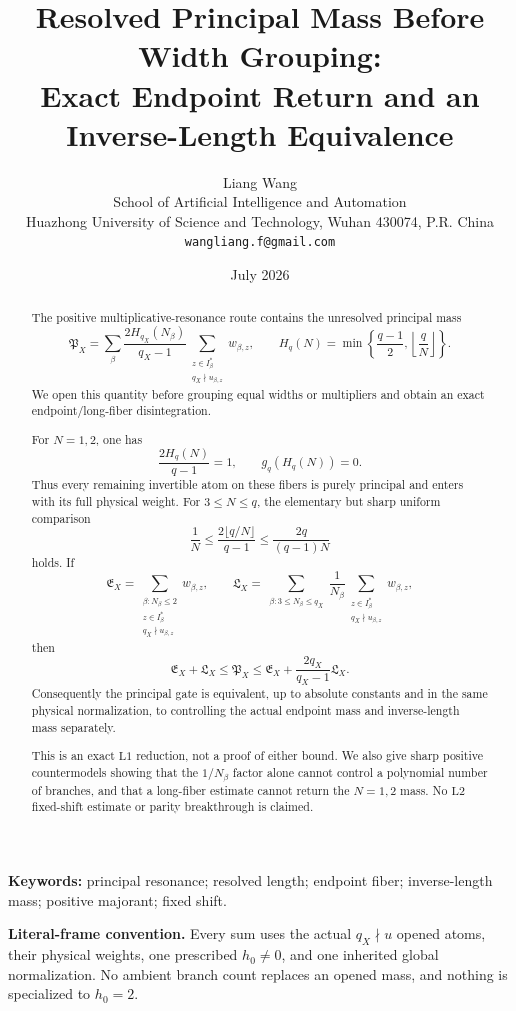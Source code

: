 \documentclass[11pt]{article}
\title{\textbf{Resolved Principal Mass Before Width Grouping:}\\
Exact Endpoint Return and an Inverse-Length Equivalence}
\author{Liang Wang\\
School of Artificial Intelligence and Automation\\
Huazhong University of Science and Technology, Wuhan 430074, P.R. China\\
\texttt{wangliang.f@gmail.com}}
\date{July 2026}
\theoremstyle{definition}
\theoremstyle{remark}
\newcommand{\Lone}{\mathrm{L1}}
\newcommand{\Ltwo}{\mathrm{L2}}
\begin{document}
\maketitle

\begin{abstract}
The positive multiplicative-resonance route contains the unresolved
principal mass
\[
 \mathfrak P_X
 =
 \sum_\beta
 \frac{2H_{q_X}(N_\beta)}{q_X-1}
 \sum_{\substack{z\in I_\beta^\ast\\q_X\nmid u_{\beta,z}}}
 w_{\beta,z},
 \qquad
 H_q(N)=
 \min\!\left\{\frac{q-1}{2},\left\lfloor\frac qN\right\rfloor\right\}.
\]
We open this quantity before grouping equal widths or multipliers
and obtain an exact endpoint/long-fiber disintegration.

For \(N=1,2\), one has
\[
 \frac{2H_q(N)}{q-1}=1,\qquad
 g_q(H_q(N))=0.
\]
Thus every remaining invertible atom on these fibers is purely
principal and enters with its full physical weight.  For
\(3\le N\le q\), the elementary but sharp uniform comparison
\[
 \frac1N
 \le
 \frac{2\lfloor q/N\rfloor}{q-1}
 \le
 \frac{2q}{(q-1)N}
\]
holds.  If
\[
 \mathfrak E_X
 =
 \sum_{\substack{\beta:N_\beta\le2\\z\in I_\beta^\ast\\
                  q_X\nmid u_{\beta,z}}}w_{\beta,z},
 \qquad
 \mathfrak L_X
 =
 \sum_{\substack{\beta:3\le N_\beta\le q_X}}
 \frac1{N_\beta}
 \sum_{\substack{z\in I_\beta^\ast\\q_X\nmid u_{\beta,z}}}
 w_{\beta,z},
\]
then
\[
 \boxed{
 \mathfrak E_X+\mathfrak L_X
 \le\mathfrak P_X
 \le
 \mathfrak E_X+
 \frac{2q_X}{q_X-1}\mathfrak L_X.}
\]
Consequently the principal gate is equivalent, up to absolute
constants and in the same physical normalization, to controlling
the actual endpoint mass and inverse-length mass separately.

This is an exact \(\Lone\) reduction, not a proof of either bound.
We also give sharp positive countermodels showing that the
\(1/N_\beta\) factor alone cannot control a polynomial number of
branches, and that a long-fiber estimate cannot return the
\(N=1,2\) mass.  No \(\Ltwo\) fixed-shift estimate or parity
breakthrough is claimed.
\end{abstract}

\noindent\textbf{Keywords:}
principal resonance; resolved length; endpoint fiber; inverse-length
mass; positive majorant; fixed shift.

\medskip
\noindent\textbf{Literal-frame convention.}
Every sum uses the actual \(q_X\nmid u\) opened atoms, their physical
weights, one prescribed \(h_0\ne0\), and one inherited global
normalization.  No ambient branch count replaces an opened mass,
and nothing is specialized to \(h_0=2\).
\end{document}
